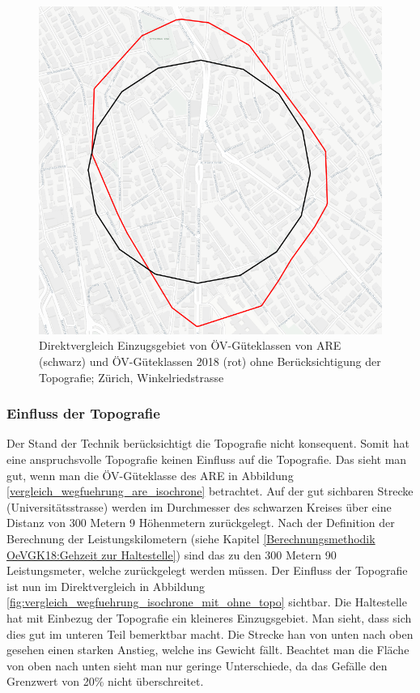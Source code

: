 \begin{figure}[ht]
    \centering
    \includegraphics[width=0.5\linewidth]{technicalreport/img/vergleich_wegfuehrung_are_isochrone}
    \caption[Direktvergleich Einzugsgebiet ARE und Isochrone]{Direktvergleich Einzugsgebiet von ÖV-Güteklassen von \ac{ARE} (schwarz) und ÖV-Güteklassen 2018 (rot) ohne Berücksichtigung der Topografie; Zürich, Winkelriedstrasse}
    \label{fig:vergleich_wegfuehrung_are_isochrone}
\end{figure}

\subsubsection{Einfluss der Topografie}

Der Stand der Technik berücksichtigt die Topografie nicht konsequent.
Somit hat eine anspruchsvolle Topografie keinen Einfluss auf die Topografie.
Das sieht man gut, wenn man die ÖV-Güteklasse des \acl{ARE} in Abbildung \ref{vergleich_wegfuehrung_are_isochrone} betrachtet.
Auf der gut sichbaren Strecke (Universitätsstrasse) werden im Durchmesser des schwarzen Kreises über eine Distanz von 300 Metern 9 Höhenmetern zurückgelegt.
Nach der Definition der Berechnung der Leistungskilometern (siehe Kapitel \ref{Berechnungsmethodik OeVGK18:Gehzeit zur Haltestelle}) sind das zu den 300 Metern 90 Leistungsmeter, welche zurückgelegt werden müssen.
Der Einfluss der Topografie ist nun im Direktvergleich in Abbildung \ref{fig:vergleich_wegfuehrung_isochrone_mit_ohne_topo} sichtbar.
Die Haltestelle hat mit Einbezug der Topografie ein kleineres Einzugsgebiet.
Man sieht, dass sich dies gut im unteren Teil bemerktbar macht.
Die Strecke han von unten nach oben gesehen einen starken Anstieg, welche ins Gewicht fällt.
Beachtet man die Fläche von oben nach unten sieht man nur geringe Unterschiede, da das Gefälle den Grenzwert von 20\% nicht überschreitet.

